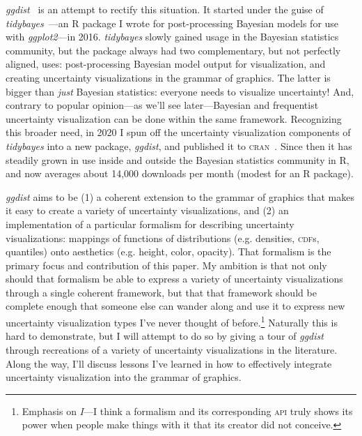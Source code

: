 \documentclass[journal]{vgtc}                     %
\begin{document}
\textit{ggdist}~\cite{kay2023ggdist} is an attempt to rectify this situation. It started under the guise of \textit{tidybayes}~\cite{kay2023tidybayes}---an R package I wrote for post-processing Bayesian models for use with \textit{ggplot2}---in 2016. \textit{tidybayes} slowly gained usage in the Bayesian statistics community, but the package always had two complementary, but not perfectly aligned, uses: post-processing Bayesian model output for visualization, and creating uncertainty visualizations in the grammar of graphics. The latter is bigger than \textit{just} Bayesian statistics: everyone needs to visualize uncertainty! And, contrary to popular opinion---as we'll see later---Bayesian and frequentist uncertainty visualization can be done within the same framework. Recognizing this broader need, in 2020 I spun off the uncertainty visualization components of \textit{tidybayes} into a new package, \textit{ggdist}, and published it to \textsc{cran}~\cite{hornik2012cran}. Since then it has steadily grown in use inside and outside the Bayesian statistics community in R, and now averages about 14,000 downloads per month (modest for an R package).

\textit{ggdist} aims to be (1) a coherent extension to the grammar of graphics that makes it easy to create a variety of uncertainty visualizations, and (2) an implementation of a particular formalism for describing uncertainty visualizations: mappings of functions of distributions (e.g. densities, \textsc{cdf}s, quantiles) onto aesthetics (e.g. height, color, opacity). That formalism is the primary focus and contribution of this paper. My ambition is that not only should that formalism be able to express a variety of uncertainty visualizations through a single coherent framework, but that that framework should be complete enough that someone else can wander along and use it to express new uncertainty visualization types I've never thought of before.\footnote{Emphasis on \textit{I}---I think a formalism and its corresponding \textsc{api} truly shows its power when people make things with it that its creator did not conceive.} Naturally this is hard to demonstrate, but I will attempt to do so by giving a tour of \textit{ggdist} through recreations of a variety of uncertainty visualizations in the literature. Along the way, I'll discuss lessons I've learned in how to effectively integrate uncertainty visualization into the grammar of graphics.

\end{document}
